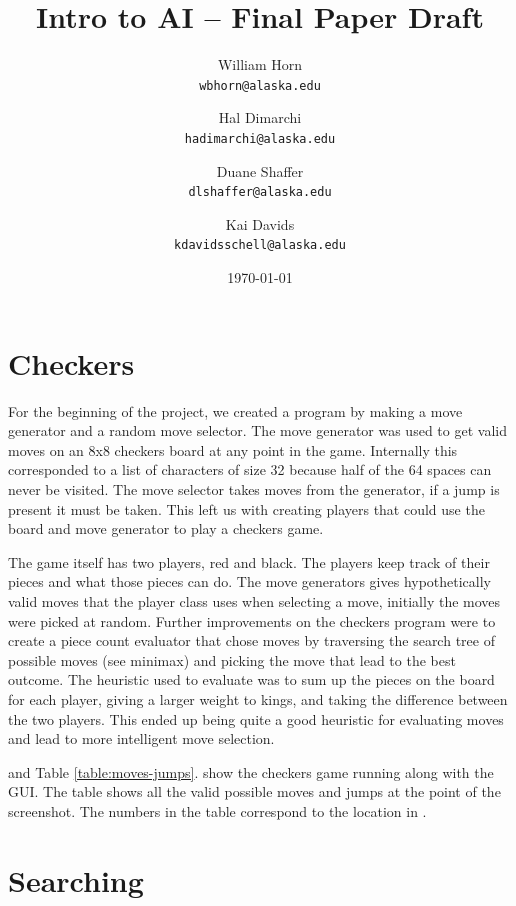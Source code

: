 \documentclass{article}
\begin{document}
\title{Intro to AI -- Final Paper Draft}
\author{
  William Horn\\
  \texttt{wbhorn@alaska.edu}
  \and
  Hal Dimarchi\\
  \texttt{hadimarchi@alaska.edu}
  \and
  Duane Shaffer\\
  \texttt{dlshaffer@alaska.edu}
  \and
  Kai Davids\\
  \texttt{kdavidsschell@alaska.edu}
}
\date{\today}
\maketitle

\section{Checkers}

For the beginning of the project, we created a program by making a
move generator and a random move selector. The move generator was used to get
valid moves on an 8x8 checkers board at any point in the game. Internally this
corresponded to a list of characters of size 32 because half of the 64 spaces
can never be visited. The move selector takes moves from the generator, if a
jump is present it must be taken. This left us with creating players that could
use the board and move generator to play a checkers game.

The game itself has two players, red and black. The players keep track of their pieces and what
those pieces can do. The move generators gives hypothetically valid moves that
the player class uses when selecting a move, initially the moves were picked at
random. Further improvements on the checkers program were to create a piece
count evaluator that chose moves by traversing the search tree of possible
moves (see minimax) and picking the move that lead to the best outcome. The
heuristic used to evaluate was to sum up the pieces on the board for each
player, giving a larger weight to kings, and taking the difference between the
two players. This ended up being quite a good heuristic for evaluating moves
and lead to more intelligent move selection.

 and Table \ref{table:moves-jumps}. show the checkers game running along with the GUI.
The table shows all the valid possible moves and jumps at the point of the
screenshot. The numbers in the table correspond to the location in .

\section{Searching}
\end{document}
